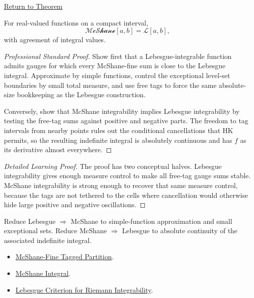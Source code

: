 \newpage
{}
\label{prf:mcshane-equals-lebesgue}
\begin{remark*}[Return]\hyperref[thm:mcshane-equals-lebesgue]{Return to Theorem}\end{remark*}
\begin{theorem*}
For real-valued functions on a compact interval,
\[
  \mathcal{McShane}[a,b]=\mathcal L[a,b],
\]
with agreement of integral values.
\end{theorem*}
\begin{proof}[Professional Standard Proof]
\LRAProofBodyStart
Show first that a Lebesgue-integrable function admits gauges for which every
McShane-fine sum is close to the Lebesgue integral. Approximate by simple
functions, control the exceptional level-set boundaries by small total
measure, and use free tags to force the same absolute-size bookkeeping as the
Lebesgue construction.

Conversely, show that McShane integrability implies Lebesgue integrability by
testing the free-tag sums against positive and negative parts. The freedom to
tag intervals from nearby points rules out the conditional cancellations that
HK permits, so the resulting indefinite integral is absolutely continuous and
has \(f\) as its derivative almost everywhere.
\end{proof}
\begin{proof}[Detailed Learning Proof]
\LRAProofBodyStart
The proof has two conceptual halves. Lebesgue integrability gives enough
measure control to make all free-tag gauge sums stable. McShane integrability
is strong enough to recover that same measure control, because the tags are
not tethered to the cells where cancellation would otherwise hide large
positive and negative oscillations.
\end{proof}
\begin{remark*}
Reduce Lebesgue \(\Rightarrow\) McShane to simple-function approximation and
small exceptional sets. Reduce McShane \(\Rightarrow\) Lebesgue to absolute
continuity of the associated indefinite integral.
\end{remark*}
\begin{dependencies}
\begin{itemize}
  \item \hyperref[def:mcshane-fine-tagged-partition]{McShane-Fine Tagged Partition}.
  \item \hyperref[def:mcshane-integral]{McShane Integral}.
  \item \hyperref[thm:lebesgue-criterion-riemann-integrability]{Lebesgue Criterion for Riemann Integrability}.
\end{itemize}
\end{dependencies}
\clearpage
